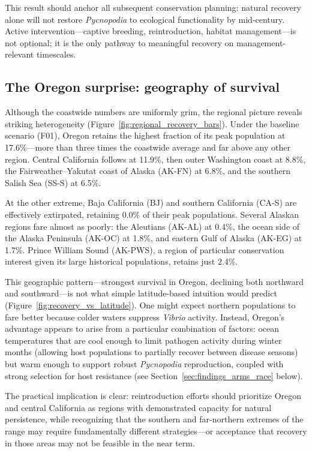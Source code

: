 This result should anchor all subsequent conservation planning: natural recovery
alone will not restore \textit{Pycnopodia} to ecological functionality by mid-century.
Active intervention---captive breeding, reintroduction, habitat management---is not
optional; it is the only pathway to meaningful recovery on management-relevant
timescales.

\subsection{The Oregon surprise: geography of survival}
\label{sec:findings_oregon}

Although the coastwide numbers are uniformly grim, the regional picture reveals
striking heterogeneity (Figure~\ref{fig:regional_recovery_bars}). Under the
baseline scenario (F01), Oregon retains the highest fraction of its peak
population at 17.6\%---more than three times the coastwide average and far above
any other region. Central California follows at 11.9\%, then outer Washington
coast at 8.8\%, the Fairweather--Yakutat coast of Alaska (AK-FN) at 6.8\%, and
the southern Salish Sea (SS-S) at 6.5\%.

At the other extreme, Baja California (BJ) and southern California (CA-S) are
effectively extirpated, retaining 0.0\% of their peak populations. Several
Alaskan regions fare almost as poorly: the Aleutians (AK-AL) at 0.4\%, the
ocean side of the Alaska Peninsula (AK-OC) at 1.8\%, and eastern Gulf of Alaska
(AK-EG) at 1.7\%. Prince William Sound (AK-PWS), a region of particular
conservation interest given its large historical populations, retains just 2.4\%.

This geographic pattern---strongest survival in Oregon, declining both northward
and southward---is not what simple latitude-based intuition would predict
(Figure~\ref{fig:recovery_vs_latitude}). One might expect northern populations to
fare better because colder waters suppress \textit{Vibrio} activity. Instead, Oregon's
advantage appears to arise from a particular combination of factors: ocean
temperatures that are cool enough to limit pathogen activity during winter months
(allowing host populations to partially recover between disease seasons) but warm
enough to support robust \textit{Pycnopodia} reproduction, coupled with strong
selection for host resistance (see Section~\ref{sec:findings_arms_race} below).

The practical implication is clear: reintroduction efforts should prioritize Oregon
and central California as regions with demonstrated capacity for natural persistence,
while recognizing that the southern and far-northern extremes of the range may
require fundamentally different strategies---or acceptance that recovery in those
areas may not be feasible in the near term.

